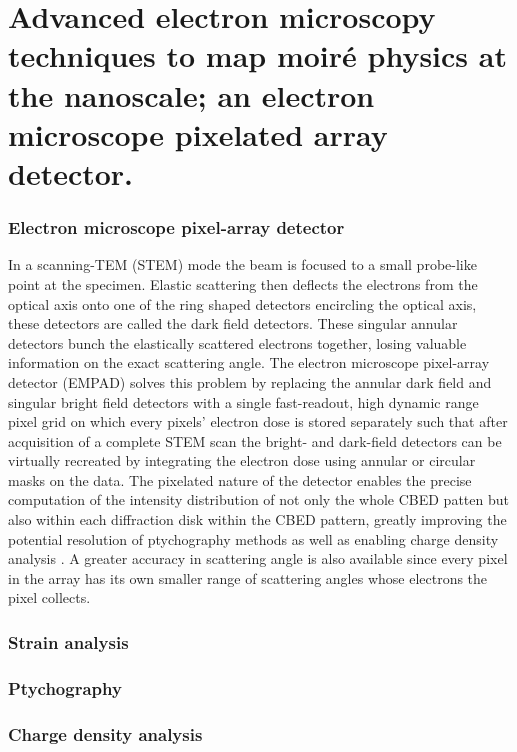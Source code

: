\section{Advanced electron microscopy techniques to map moiré physics at the nanoscale; an electron microscope pixelated array detector.}

\subsubsection{Electron microscope pixel-array detector}
In a scanning-TEM (STEM) mode the beam is focused to a small probe-like point at the specimen. Elastic scattering then deflects the electrons from the optical axis onto one of the ring shaped detectors encircling the optical axis, these detectors are called the dark field detectors. These singular annular detectors bunch the elastically scattered electrons together, losing valuable information on the exact scattering angle. The electron microscope pixel-array detector (EMPAD) solves this problem by replacing the annular dark field and singular bright field detectors with a single fast-readout, high dynamic range pixel grid on which every pixels' electron dose is stored separately such that after acquisition of a complete STEM scan the bright- and dark-field detectors can be virtually recreated by integrating the electron dose using annular or circular masks on the data.
The pixelated nature of the detector enables the precise computation of the intensity distribution of not only the whole CBED patten but also within each diffraction disk within the CBED pattern, greatly improving the potential resolution of ptychography methods \cite{pennycookEfficientPhaseContrast2015, yangEfficientPhaseContrast2015a} as well as enabling charge density analysis \cite{hachtelSubAngstromElectricField2018,wenMapping1DConfined2022,fangAtomicElectrostaticMaps2019}.
A greater accuracy in scattering angle is also available since every pixel in the array has its own smaller range of scattering angles whose electrons the pixel collects.


\subsubsection{Strain analysis}

\subsubsection{Ptychography}

\subsubsection{Charge density analysis}




